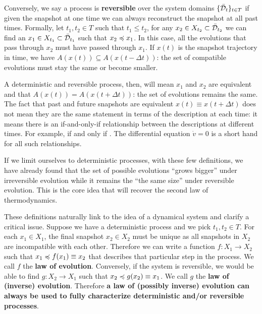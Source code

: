 \documentclass[letterpaper]{article}
\begin{document}
Conversely, we say a process is \textbf{reversible} over the system domains $\{\bar{\mathcal{D}}_t\}_{t \in T}$ if given the snapshot at one time we can always reconstruct the snapshot at all past times. Formally, let $t_1, t_2 \in T$ such that $t_1 \leq t_2$, for any $x_2 \in X_{t_2} \subset \bar{\mathcal{D}}_{t_2}$ we can find an $x_1 \in X_{t_1} \subset \bar{\mathcal{D}}_{t_1}$ such that $x_2 \preccurlyeq x_1$. In this case, all the evolutions that pass through $x_2$ must have passed through $x_1$. If $x(t)$ is the snapshot trajectory in time, we have $A(x(t)) \subseteq A(x(t - \Delta t))$: the set of compatible evolutions must stay the same or become smaller.

A deterministic and reversible process, then, will mean $x_1$ and $x_2$ are equivalent and that  $A(x(t)) = A(x(t + \Delta t))$: the set of evolutions remains the same. The fact that past and future snapshots are equivalent $x(t) \equiv x(t + \Delta t)$ does not mean they are the same statement in terms of the description at each time: it means there is an if-and-only-if relationship between the descriptions at different times. For example,  if and only if . The differential equation $\dot{v} = 0$ is a short hand for all such relationships.

If we limit ourselves to deterministic processes, with these few definitions, we have already found that the set of possible evolutions ``grows bigger'' under irreversible evolution while it remains the ``the same size'' under reversible evolution. This is the core idea that will recover the second law of thermodynamics.

These definitions naturally link to the idea of a dynamical system and clarify a critical issue. Suppose we have a deterministic process and we pick $t_1, t_2 \in T$. For each $x_1 \in X_1$, the final snapshot $x_2 \in X_2$ must be unique as all snapshots in $X_2$ are incompatible with each other. Therefore we can write a function $f : X_1 \to X_2$ such that $x_1 \preccurlyeq f(x_1) \equiv x_2$ that describes that particular step in the process. We call $f$ the \textbf{law of evolution}. Conversely, if the system is reversible, we would be able to find $g : X_2 \to X_1$ such that $x_2 \preccurlyeq g(x_2) \equiv x_1$.  We call $g$ the \textbf{law of (inverse) evolution}. Therefore \textbf{a law of (possibly inverse) evolution can always be used to fully characterize deterministic and/or reversible processes}.
\end{document}
